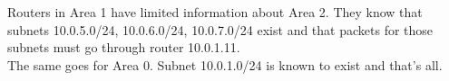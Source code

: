 Routers in Area 1 have limited information about Area 2. They know that subnets 10.0.5.0/24, 10.0.6.0/24, 10.0.7.0/24 exist and that packets for those subnets must go through router 10.0.1.11. \\
The same goes for Area 0. Subnet 10.0.1.0/24 is known to exist and that's all.
